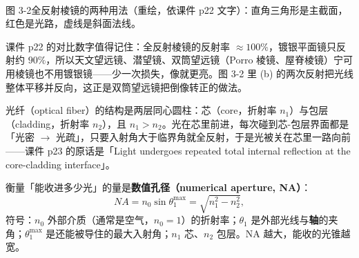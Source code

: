 \documentclass[11pt]{ctexart}
\begin{document}
\begin{center}\begin{minipage}{0.97\linewidth}\centering
{}\\
{\small 图 3-2\quad 全反射棱镜的两种用法（重绘，依课件 p22 文字）：直角三角形是主截面，红色是光路，虚线是斜面法线。}
\end{minipage}\end{center}

课件 p22 的对比数字值得记住：全反射棱镜的反射率 $\approx100\%$，镀银平面镜只反射约 $90\%$，所以天文望远镜、潜望镜、双筒望远镜（Porro 棱镜、屋脊棱镜）宁可用棱镜也不用镀银镜——少一次损失，像就更亮。图 3-2 里 (b) 的两次反射把光线整体平移并反向，这正是双筒望远镜把倒像转正的做法。

光纤（optical fiber）的结构是两层同心圆柱：芯（core，折射率 $n_1$）与包层（cladding，折射率 $n_2$），且 $n_1>n_2$。光在芯里前进，每次碰到芯-包层界面都是「光密 $\rightarrow$ 光疏」，只要入射角大于临界角就全反射，于是光被关在芯里一路向前——课件 p23 的原话是「Light undergoes repeated total internal reflection at the core-cladding interface」。

衡量「能收进多少光」的量是\textbf{数值孔径（numerical aperture, NA）}：
\[
NA=n_0\sin\theta_1^{\max}=\sqrt{n_1^2-n_2^2},
\]
符号：$n_0$ 外部介质（通常是空气，$n_0=1$）的折射率；$\theta_1$ 是外部光线与\textbf{轴}的夹角；$\theta_1^{\max}$ 是还能被导住的最大入射角；$n_1$ 芯、$n_2$ 包层。NA 越大，能收的光锥越宽。
\end{document}
